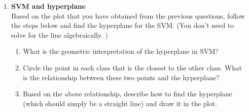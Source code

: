 \documentclass[12pt]{article}
\begin{document}
\begin{enumerate}
    \item \textbf{SVM and hyperplane} \\
    Based on the plot that you have obtained from the previous questions, follow the steps below and find the hyperplane for the SVM. (You don't need to solve for the line algebraically. )
    \begin{enumerate}
        \item What is the geometric interpretation of the hyperplane in SVM?\\
        
        \item Circle the point in each class that is the closest to the other class. What is the relationship between these two points and the hyperplane?\\
        
        \item Based on the above relationship, describe how to find the hyperplane (which should simply be a straight line) and draw it in the plot.  
    \end{enumerate}
\end{enumerate}

\newpage
\end{document}
